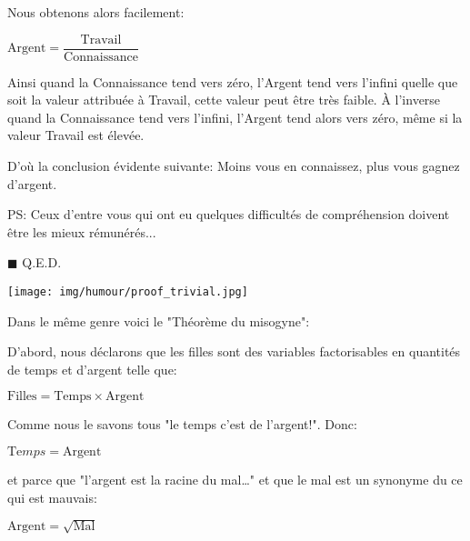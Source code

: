 Nous obtenons alors facilement: 

\begin{center}
$\text{Argent}=\dfrac{\text{Travail}}{\text{Connaissance}}$
\end{center}

Ainsi quand la Connaissance tend vers zéro, l'Argent tend vers l'infini quelle que soit la valeur attribuée à Travail, cette valeur peut être très faible. À l'inverse quand la Connaissance tend vers l'infini, l'Argent tend alors vers zéro, même si la valeur Travail est élevée.

D'où la conclusion évidente suivante: Moins vous en connaissez, plus vous gagnez d'argent.

PS: Ceux d'entre vous qui ont eu quelques difficultés de compréhension doivent être les mieux rémunérés... 

	\begin{flushright}
		$\blacksquare$  Q.E.D.
	\end{flushright}

	\begin{center}\underline{\hspace{5 cm}}\end{center}
	
	\begin{center}
		\texttt{[image: img/humour/proof\_trivial.jpg]}	
	\end{center}
	
	\begin{center}\underline{\hspace{5 cm}}\end{center}	
	
Dans le même genre voici le "Théorème du misogyne":

D'abord, nous déclarons que les filles sont des variables factorisables en quantités de temps et d'argent telle que:

\begin{center}
$\text{Filles}=\text{Temps}\times\text{Argent}$
\end{center}

Comme nous le savons tous "le temps c'est de l'argent!". Donc:

\begin{center}
$\text{Te}mps=\text{Argent}$
\end{center}

et parce que "l'argent est la racine du mal…" et que le mal est un synonyme du ce qui est mauvais:

\begin{center}
$\text{Argent}=\sqrt{\text{Mal}}$
\end{center}

